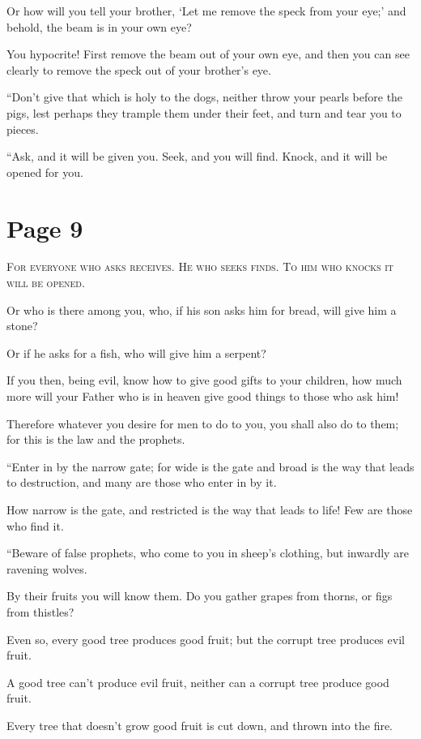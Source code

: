 Or how will you tell your brother, ‘Let me remove the speck from your eye;’ and behold, the beam is in your own eye?

You hypocrite! First remove the beam out of your own eye, and then you can see clearly to remove the speck out of your brother’s eye.

“Don’t give that which is holy to the dogs, neither throw your pearls before the pigs, lest perhaps they trample them under their feet, and turn and tear you to pieces.

“Ask, and it will be given you. Seek, and you will find. Knock, and it will be opened for you.



\chapterornament
\section*{Page 9}

\lettrine{F}{or everyone who asks receives. He who seeks finds. To him who knocks it will be opened.}

Or who is there among you, who, if his son asks him for bread, will give him a stone?

Or if he asks for a fish, who will give him a serpent?

If you then, being evil, know how to give good gifts to your children, how much more will your Father who is in heaven give good things to those who ask him!

Therefore whatever you desire for men to do to you, you shall also do to them; for this is the law and the prophets.

“Enter in by the narrow gate; for wide is the gate and broad is the way that leads to destruction, and many are those who enter in by it.

How narrow is the gate, and restricted is the way that leads to life! Few are those who find it.

“Beware of false prophets, who come to you in sheep’s clothing, but inwardly are ravening wolves.

By their fruits you will know them. Do you gather grapes from thorns, or figs from thistles?

Even so, every good tree produces good fruit; but the corrupt tree produces evil fruit.

A good tree can’t produce evil fruit, neither can a corrupt tree produce good fruit.

Every tree that doesn’t grow good fruit is cut down, and thrown into the fire.

